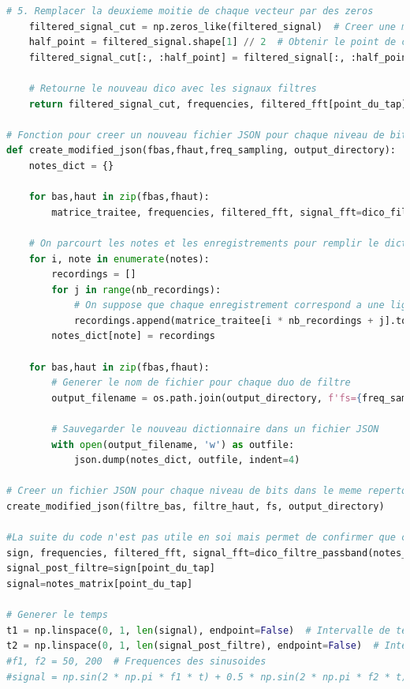\documentclass[11pt,letterpaper]{article}
\begin{document}
\begin{lstlisting}[language=python]
    # 5. Remplacer la deuxieme moitie de chaque vecteur par des zeros
    filtered_signal_cut = np.zeros_like(filtered_signal)  # Creer une matrice du meme type, remplie de zeros
    half_point = filtered_signal.shape[1] // 2  # Obtenir le point de coupure (moitie)
    filtered_signal_cut[:, :half_point] = filtered_signal[:, :half_point]
    
    # Retourne le nouveau dico avec les signaux filtres
    return filtered_signal_cut, frequencies, filtered_fft[point_du_tap], signal_fft[point_du_tap]

# Fonction pour creer un nouveau fichier JSON pour chaque niveau de bits
def create_modified_json(fbas,fhaut,freq_sampling, output_directory):
    notes_dict = {}
    
    for bas,haut in zip(fbas,fhaut):
        matrice_traitee, frequencies, filtered_fft, signal_fft=dico_filtre_passband(notes_matrix,bas,haut)

    # On parcourt les notes et les enregistrements pour remplir le dictionnaire
    for i, note in enumerate(notes):
        recordings = []
        for j in range(nb_recordings):
            # On suppose que chaque enregistrement correspond a une ligne dans notes_matrix
            recordings.append(matrice_traitee[i * nb_recordings + j].tolist())  # Convertir en liste
        notes_dict[note] = recordings

    for bas,haut in zip(fbas,fhaut):
        # Generer le nom de fichier pour chaque duo de filtre
        output_filename = os.path.join(output_directory, f'fs={freq_sampling}-fbas={bas}-fhaut={haut}.json')

        # Sauvegarder le nouveau dictionnaire dans un fichier JSON
        with open(output_filename, 'w') as outfile:
            json.dump(notes_dict, outfile, indent=4)

# Creer un fichier JSON pour chaque niveau de bits dans le meme repertoire que le fichier original
create_modified_json(filtre_bas, filtre_haut, fs, output_directory)

#La suite du code n'est pas utile en soi mais permet de confirmer que ca donne la bonne chose
sign, frequencies, filtered_fft, signal_fft=dico_filtre_passband(notes_matrix,filtre_bas[0],filtre_haut[0])
signal_post_filtre=sign[point_du_tap]
signal=notes_matrix[point_du_tap]

# Generer le temps 
t1 = np.linspace(0, 1, len(signal), endpoint=False)  # Intervalle de temps
t2 = np.linspace(0, 1, len(signal_post_filtre), endpoint=False)  # Intervalle de temps
#f1, f2 = 50, 200  # Frequences des sinusoides
#signal = np.sin(2 * np.pi * f1 * t) + 0.5 * np.sin(2 * np.pi * f2 * t)


\end{lstlisting}
\end{document}
